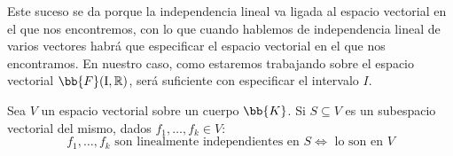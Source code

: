 Este suceso se da porque la independencia lineal va ligada al espacio vectorial en el que nos encontremos, con lo que cuando hablemos de independencia lineal de varios vectores habrá que especificar el espacio vectorial en el que nos encontramos. En nuestro caso, como estaremos trabajando sobre el espacio vectorial $\bb{F}(\text{I},\mathbb{R})$, será suficiente con especificar el intervalo $I$.

\begin{prop}
    Sea $V$ un espacio vectorial sobre un cuerpo $\bb{K}$. Si $S\subseteq V$ es un subespacio vectorial del mismo, dados $f_1,\ldots,f_k\in V$:
    \begin{equation*}
        f_1,\ldots,f_k \text{\ son linealmente independientes en\ } S \Longleftrightarrow \text{\ lo son en\ } V
    \end{equation*}
\end{prop}

